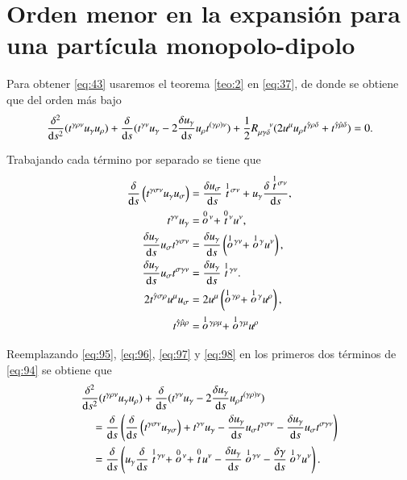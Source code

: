 \chapter{Orden menor en la expansi\'on para una part\'icula monopolo-dipolo}
\label{ape:3}

Para obtener \eqref{eq:43} usaremos el teorema \ref{teo:2} en \eqref{eq:37}, de donde se obtiene que del orden m\'as bajo
\begin{equation}
\label{eq:94}
\frac{\delta^2}{\mathrm{d}s^2} (t^{\gamma \rho \nu} u_{\gamma}u_{\rho}) + \frac{\delta }{\mathrm{d}s} (t^{\gamma \nu} u_{\gamma} - 2\frac{\delta u_{\gamma}}{\mathrm{d}s} u_{\rho} t^{(\gamma \rho) \nu}) + \frac{1}{2} R^{\ \ \ \ \nu}_{\mu \gamma \delta} (2 u^{\mu} u_{\rho} t^{\hat{\gamma} \rho \delta} + t^{\hat{\gamma} \hat{\mu} \delta}) = 0.
\end{equation}

Trabajando cada t\'ermino por separado se tiene que
\begin{align}
\label{eq:95}
\cd{} \left( t^{\gamma \sigma \nu} u_{\gamma} u_{\sigma} \right) &= \cd{u_{\sigma}} \des{1}{t}^{\sigma \nu} + u_{\gamma} \cd{\des{1}{t}^{\sigma \nu}},\\
\label{eq:96}
t^{\gamma \nu} u_{\gamma} &= \ \des{0}{o}^{\nu} + \des{0}{t}^{\nu} u^{\nu},\\
\label{eq:97}
\cd{u_{\gamma}} u_{\sigma} t^{\gamma \sigma \nu} &= \cd{u_{\gamma}} \left( \des{1}{o}^{\gamma \nu} + \des{1}{o}^{\gamma} u^{\nu} \right),\\
\label{eq:98}
\cd{u_{\gamma}} u_{\sigma} t^{\sigma \gamma \nu} &= \cd{u_{\gamma}} \des{1}{t}^{\gamma \nu}.\\
\label{eq:100}
2 t^{\hat{\gamma} \sigma \rho} u^{\mu} u_{\sigma} &= 2u^{\mu} \left( \des{1}{o}^{\gamma \rho} + \des{1}{o}^{\gamma} u^{\rho} \right),\\
\label{eq:101}
t^{\hat{\gamma} \hat{\mu} \rho} &= \ \des{1}{o}^{\gamma \rho \mu} + \des{1}{o}^{\gamma \mu} u^{\rho}
\end{align}

Reemplazando \eqref{eq:95}, \eqref{eq:96}, \eqref{eq:97} y \eqref{eq:98} en los primeros dos t\'erminos de \eqref{eq:94} se obtiene que
\begin{align}
& \frac{\delta^2}{\mathrm{d}s^2} (t^{\gamma \rho \nu} u_{\gamma}u_{\rho}) + \frac{\delta }{\mathrm{d}s} (t^{\gamma \nu} u_{\gamma} - 2\frac{\delta u_{\gamma}}{\mathrm{d}s} u_{\rho} t^{(\gamma \rho) \nu}) \nonumber\\
& \quad = \frac{\delta }{\mathrm{d}s} \left( \frac{\delta }{\mathrm{d}s} \left( t^{\gamma \sigma \nu} u_{\gamma \sigma} \right) + t^{\gamma \nu} u_{\gamma} - \frac{\delta u_{\gamma}}{\mathrm{d}s} u_{\sigma} t^{\gamma \sigma \nu} - \frac{\delta u_{\gamma}}{\mathrm{d}s} u_{\sigma} t^{\sigma \gamma \nu} \right) \nonumber \\
\label{eq:99}
& \quad = \frac{\delta }{\mathrm{d}s} \left( u_{\gamma} \frac{\delta }{\mathrm{d}s} \stackrel{1}{t}{\!}^{\gamma \nu} + \stackrel{0}{o}{\!}^{\nu} + \stackrel{0}{t}{\!} u^{\nu} - \frac{\delta u_{\gamma}}{\mathrm{d}s} \stackrel{1}{o}{\!}^{\gamma \nu} - \frac{\delta \gamma}{\mathrm{d}s} \stackrel{1}{o}{\!}^{\gamma}u^{\nu} \right).
\end{align}

